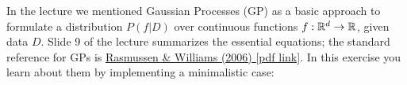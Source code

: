

\renewcommand{\course}{Optimization Algorithms}
\renewcommand{\coursepicture}{optim}
\renewcommand{\coursedate}{Winter 2024/25}
\renewcommand{\exnum}{Weekly Exercises 10}

\exercises


\exercisestitle



In the lecture we mentioned Gaussian Processes (GP) as a basic approach to formulate a distribution $P(f|D)$ over continuous functions $f:{\mathbb{R}}^d \to {\mathbb{R}}$, given data $D$. Slide 9 of the lecture summarizes the essential equations; the standard reference for GPs is \href{http://robotics.caltech.edu/wiki/images/d/d1/RasumussenWilliamsBook.pdf}{Rasmussen \& Williams (2006) [pdf link]}. In this exercise you learn about them by implementing a minimalistic case:

